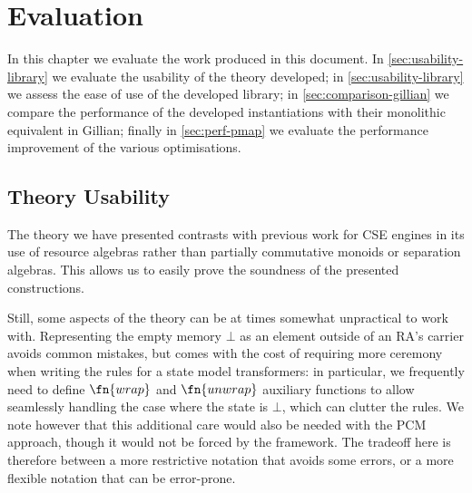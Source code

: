\chapter{Evaluation}

In this chapter we evaluate the work produced in this document. In \cref{sec:usability-library} we evaluate the usability of the theory developed; in \cref{sec:usability-library} we assess the ease of use of the developed library; in \cref{sec:comparison-gillian} we compare the performance of the developed instantiations with their monolithic equivalent in Gillian; finally in \cref{sec:perf-pmap} we evaluate the performance improvement of the various \PMap{} optimisations. 

\section{Theory Usability} \label{sec:usability-theory}

The theory we have presented contrasts with previous work for CSE engines in its use of resource algebras rather than partially commutative monoids or separation algebras. This allows us to easily prove the soundness of the presented constructions. 

Still, some aspects of the theory can be at times somewhat unpractical to work with. Representing the empty memory $\bot$ as an element outside of an RA's carrier avoids common mistakes, but comes with the cost of requiring more ceremony when writing the rules for a state model transformers: in particular, we frequently need to define $\fn{wrap}$ and $\fn{unwrap}$ auxiliary functions to allow seamlessly handling the case where the state is $\bot$, which can clutter the rules. We note however that this additional care would also be needed with the PCM approach, though it would not be forced by the framework. The tradeoff here is therefore between a more restrictive notation that avoids some errors, or a more flexible notation that can be error-prone.

